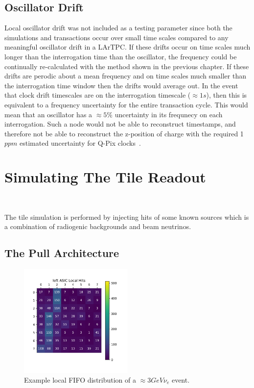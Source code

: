 \subsection{Oscillator Drift}

Local oscillator drift was not included as a testing parameter since both the simulations and transactions occur over small time scales compared to any meaningful oscillator drift in a LArTPC.
If these drifts occur on time scales much longer than the interrogation time than the oscillator, the frequency could be continually re-calculated with the method shown in the previous chapter.
If these drifts are perodic about a mean frequency and on time scales much smaller than the interrogation time window then the drifts would average out.
In the event that clock drift timescales are on the interrogation timescale ($\approx 1\unit{s}$), then this is equivalent to a frequency uncertainty for the entire transaction cycle.
This would mean that an oscillator has a $\approx 5\%$ uncertainty in its frequnecy on each interrogation.
Such a node would not be able to reconstruct timestamps, and therefore not be able to reconstruct the z-position of charge with the required 1$\unit{ppm}$ estimated uncertainty for Q-Pix clocks~\citep{qpix:nygren:mei}.

\section{Simulating The Tile Readout}~\label{sec:simulating_tile}

The tile simulation is performed by injecting hits of some known sources which is a combination of radiogenic backgrounds and beam neutrinos.


\subsection{The Pull Architecture}

\begin{figure}[]
\centering
\includegraphics[width=0.5\textwidth]{images/left_asic_local.pdf}
\caption{Example local FIFO distribution of a $\approx 3\unit{GeV} \nu_{e}$ event.}
\end{figure}~\label{fig:local_buffer_hit_example}


